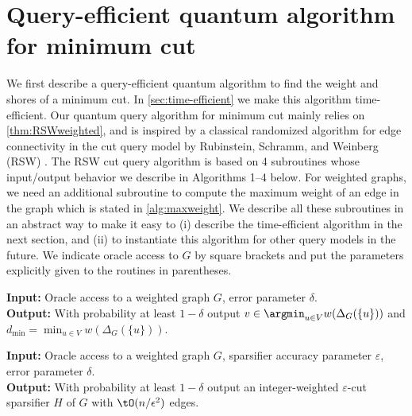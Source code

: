 \section{Query-efficient quantum algorithm for minimum cut} \label{sec:query-efficient}
We first describe a query-efficient quantum algorithm to find the weight and shores of a minimum cut.
In \cref{sec:time-efficient} we make this algorithm time-efficient.
Our quantum query algorithm for minimum cut mainly relies on \cref{thm:RSWweighted}, and is inspired by a classical randomized algorithm for edge connectivity in the cut query model by Rubinstein, Schramm, and Weinberg (RSW) \cite{RSW18}.  
The RSW cut query algorithm is based on 4 subroutines whose input/output behavior we describe in Algorithms 1--4 below.  
For weighted graphs, we need an additional subroutine to compute the maximum weight of an edge in the graph which is stated in \cref{alg:maxweight}.
We describe all these subroutines in an abstract way to make it easy to (i) describe the time-efficient algorithm in the next section, and (ii) to instantiate this algorithm for other query models in the future.
We indicate oracle access to $G$ by square brackets and put the parameters explicitly given to the routines in parentheses.

\begin{algorithm}[H]
\caption{FindMinStar$[G](\delta)$}
\label{alg:mindeg}
 \hspace*{\algorithmicindent} \textbf{Input:} Oracle access to a weighted graph $G$, error parameter $\delta$. \\
 \hspace*{\algorithmicindent} \textbf{Output:} With probability at least $1-\delta$ output $v \in \argmin_{u \in V} w(\Delta_G(\{u\}))$ and 
 $d_{\min} = \min_{u \in V} w(\Delta_G(\{u\}))$.
\end{algorithm}

\begin{algorithm}[H]
\caption{Cut-Sparsifier$[G](\varepsilon, \delta)$}
\label{alg:sparsify}
 \hspace*{\algorithmicindent} \textbf{Input:} Oracle access to a weighted graph $G$, sparsifier accuracy parameter $\varepsilon$, error parameter $\delta$. \\
 \hspace*{\algorithmicindent} \textbf{Output:} With probability at least $1-\delta$ output an integer-weighted $\varepsilon$-cut sparsifier $H$ of $G$ with $\tO(n/\epsilon^2)$ edges.
\end{algorithm}

